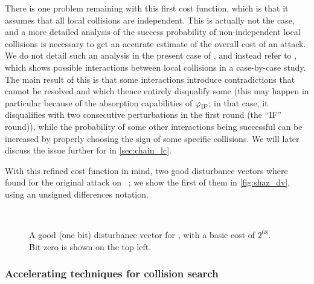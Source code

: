 There is one problem remaining with this first cost function, which is that it assumes that all local collisions are independent. This is actually not the case, and a more detailed analysis of
the success probability of non-independent local collisions is necessary to get an accurate estimate of the overall cost of an attack. We do not detail such an analysis in the present case
of \shazero, and instead refer to \cite[Chapter 5]{algocrypt}, which shows possible interactions between local collisions in a case-by-case study. The main result of this is that
some interactions introduce contradictions that cannot be resolved and which thence entirely disqualify some \dvs (this may happen in particular because of the absorption capabilities
of $\operatorname{\varphi}_\text{IF}$; in that case, it disqualifies \dvs with two consecutive perturbations in the first round (the ``IF'' round)),
while the probability of some other interactions being successful can be increased by properly choosing the sign of some specific collisions. We will later discuss
the issue further for \shaone in \autoref{sec:chain_lc}.

With this refined cost function in mind, two good disturbance vectors where found for the original attack on \shazero~\cite{DBLP:conf/crypto/ChabaudJ98}; we show the first of them in
\autoref{fig:shaz_dv}, using an unsigned differences notation.

\begin{figure}[ht]
\begin{center}
\nodiff \nodiff \nodiff \onediff \nodiff \nodiff \nodiff \nodiff \nodiff \nodiff \nodiff \onediff \nodiff \nodiff \onediff \nodiff \nodiff \nodiff \nodiff \nodiff
\nodiff \nodiff \onediff \nodiff \nodiff \nodiff \nodiff \onediff \onediff \nodiff \onediff \onediff \nodiff \onediff \onediff \onediff \onediff \onediff \onediff \nodiff\\

\onediff \onediff \nodiff \onediff \nodiff \nodiff \onediff \nodiff \nodiff \nodiff \nodiff \onediff \nodiff \onediff \nodiff \onediff \nodiff \nodiff \onediff \nodiff
\onediff \nodiff \onediff \nodiff \nodiff \nodiff \onediff \nodiff \onediff \onediff \onediff \nodiff \nodiff \onediff \onediff \nodiff \nodiff \nodiff \nodiff \nodiff
\end{center}
\caption{A good (one bit) disturbance vector for \shazero, with a basic cost of $2^{68}$. Bit zero is shown on the top left.\label{fig:shaz_dv}}
\end{figure}

\subsubsection{Accelerating techniques for collision search}
\label{sec:acc_techs_sha0}

